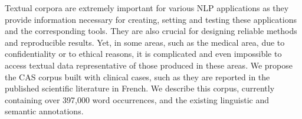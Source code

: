 Textual corpora are extremely important for various NLP applications as they provide information necessary for creating, setting and testing these applications and the corresponding tools. They are also crucial for designing reliable methods and reproducible results. Yet, in some areas, such as the medical area, due to confidentiality or to ethical reasons, it is complicated and even impossible to access textual data representative of those produced in these areas. We propose the CAS corpus built with clinical cases, such as they are reported in the published scientific literature in French.  We describe this corpus, currently containing over 397,000 word occurrences, and the existing linguistic and semantic annotations.
